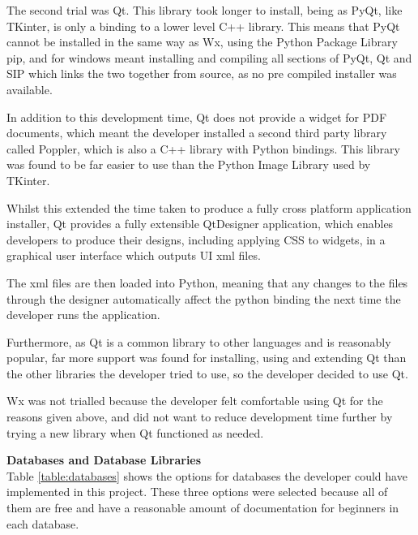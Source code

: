  
 The second trial was Qt. This library took longer to install, being as PyQt, like TKinter, is only a binding to a lower level C++ library. This means that PyQt cannot be installed in the same way as Wx, using the Python Package Library pip, and for windows meant installing and compiling all sections of PyQt, Qt and SIP which links the two together from source, as no pre compiled installer was available.
 
 In addition to this development time, Qt does not provide a widget for PDF documents, which meant the developer installed a second third party library called Poppler, which is also a C++ library with Python bindings. This library was found to be far easier to use than the Python Image Library used by TKinter.
 
 Whilst this extended the time taken to produce a fully cross platform application installer, Qt provides a fully extensible QtDesigner application, which enables developers to produce their designs, including applying CSS to widgets, in a graphical user interface which outputs UI xml files. 
 
 The xml files are then loaded into Python, meaning that any changes to the files through the designer automatically affect the python binding the next time the developer runs the application.

Furthermore, as Qt is a common library to other languages and is reasonably popular, far more support was found for installing, using and extending Qt than the other libraries the developer tried to use, so the developer decided to use Qt.

Wx was not trialled because the developer felt comfortable using Qt for the reasons given above, and did not want to reduce development time further by trying a new library when Qt functioned as needed.

\textbf{Databases and Database Libraries}\\
Table \ref{table:databases} shows the options for databases the developer could have implemented in this project. These three options were selected because all of them are free and have a reasonable amount of documentation for beginners in each database.

